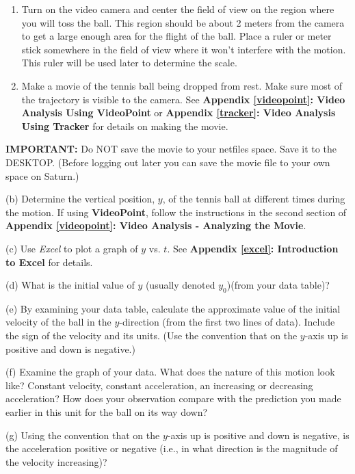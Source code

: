 \begin{enumerate}
\item Turn on the video camera and center the field of view on the region where you will toss the ball. This region should be about 2 meters from the camera to
get a large enough area for the flight of the ball. Place a ruler or meter stick somewhere in the field of view where it won't interfere with the motion. This
ruler will be used later to determine the scale. 
\item Make a movie of the tennis ball being dropped from rest. Make sure most of the trajectory is visible to the camera. See \textbf{Appendix \ref{videopoint}: Video Analysis Using VideoPoint} or \textbf{Appendix \ref{tracker}: Video Analysis Using Tracker} for details on making the movie.
\end{enumerate}
\textbf{IMPORTANT:} Do NOT save the movie to your netfiles space.  Save it to the DESKTOP.  (Before logging out later you can save the movie file to your own space on Saturn.)
\vspace{5mm}

(b) Determine the vertical position, $y$, of the tennis ball at different times
during the motion. If using \textbf{VideoPoint}, follow the instructions in the second section of \textbf{Appendix \ref{videopoint}: Video Analysis - Analyzing the Movie}. 

(c) Use \textit{Excel} to plot a graph of $y$ vs. $t$. See \textbf{Appendix
\ref{excel}: Introduction to Excel} for details.

(d) What is the initial value of $y$ (usually denoted \( y_{0} \))(from your data table)? 
\vspace{10mm}

(e) By examining your data table, calculate the approximate value of the initial velocity of the ball in the $y$-direction (from the first two lines of data). Include the sign of the velocity and its units. (Use the convention that on the $y$-axis up is positive and down is negative.)
\vspace{20mm}

(f) Examine the graph of your data. What does the nature of this motion look
like? Constant velocity, constant acceleration, an increasing or decreasing
acceleration? How does your observation compare with the prediction you made
earlier in this unit for the ball on its way down?
\vspace{20mm}

(g) Using the convention that on the $y$-axis up is positive and down is negative, is the acceleration positive or negative (i.e., in what direction is the magnitude of the velocity increasing)?
\vspace{20mm}

